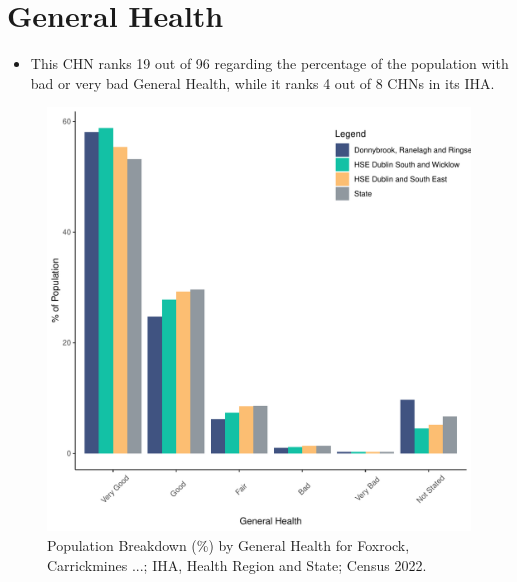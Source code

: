 \documentclass{article}
\begin{document}
\pagebreak

\section{General Health}\label{sect:GenHealth}
\begin{itemize}
\item  This CHN ranks  19 out of 96 regarding the percentage of the population with bad or very bad General Health, while it ranks   4 out of 8 CHNs in its IHA.
\end{itemize}
\begin{figure}[h]
	\centering
	\includegraphics[width = 150mm]{../figures/GenED.pdf}
	\caption{Population Breakdown (\%) by General Health for Foxrock, Carrickmines ...; IHA, Health Region and State;  Census 2022.}
	\label{fig:2ae19629-1a6a-13a3-e055-000000000001}
	\end{figure}
\end{document}

